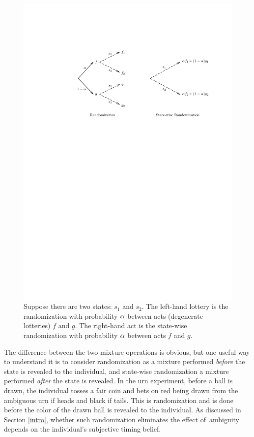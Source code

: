 \documentclass[12pt, notitlepage]{article}
\begin{document}
\begin{figure}[h!]
  \centering   
    \includegraphics{img/eaep_main.pdf}
    \caption{Suppose there are
two states: $s_{1}$ and $s_{2}$. The left-hand lottery is the randomization
with probability $\protect\alpha $ between acts (degenerate lotteries) $f$
and $g$. The right-hand act is the state-wise randomization with probability 
$\protect\alpha $ between acts $f$ and $g$.}
\label{fig_rswr}
\end{figure}


The difference between the two mixture operations is obvious, but one useful
way to understand it is to consider randomization as a mixture performed 
\textit{before} the state is revealed to the individual, and state-wise
randomization a mixture performed \textit{after} the state is revealed. In
the urn experiment, before a ball is drawn, the individual tosses a fair
coin and bets on red being drawn from the ambiguous urn if heads and black
if tails. This is randomization and is done before the color of the drawn
ball is revealed to the individual. As discussed in Section \ref{intro},
whether such randomization eliminates the effect of\ ambiguity depends on
the individual's subjective timing belief.
\end{document}
